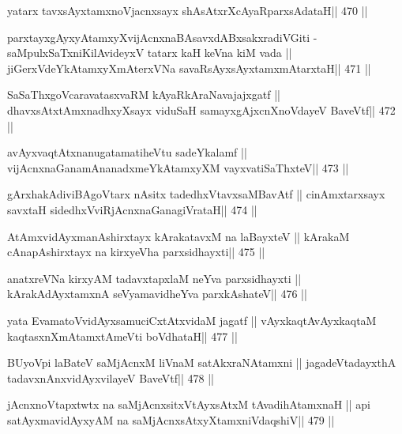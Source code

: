 \begin{shl}
yatarx tavxsAyx\s\s tamxnoV\s jacnxsayx shAsAtxrXcAyaRparxsAdataH\hfill || 470 ||
\end{shl}

\begin{shl}
parxtayxgAyxyAtamxyXvijAcnxnaBAsavxdABxsakxradiVGiti -
saMpulxSaTxniKilAvideyxV tatarx kaH keVna kiM vada ||
jiGerxVdeYkAtamxyXmAterxVNa savaRsAyxsAyx\s\s tamxmAtarxtaH\hfill || 471 ||
\end{shl}

\begin{shl}
SaSaThxgoVcaravatasxvaRM kAyaRkAraNavajajxgatf ||
dhavxsAtxtAmxnadhxyXsayx viduSaH samayxgAjxcnXnoVdayeV BaveVtf\hfill || 472 ||
\end{shl}

\begin{shl}
avAyxvaqtAtxnanugatamatiheVtu sadeYkalamf ||
vijAcnxnaGanamAnanadxmeYkAtamxyXM vayxvatiSaThxteV\hfill || 473 ||
\end{shl}

\begin{shl}
gArxhakAdiviBAgoV\s tarx nAsitx tadedhxVtavxsaMBavAtf ||
cinAmxtarxsayx savxtaH sidedhxVviRjAcnxnaGanagiVrataH\hfill || 474 ||
\end{shl}

\begin{shl}
AtAmxvidAyxmanAshirxtayx kArakatavxM na laBayxteV ||
kArakaM cAnapAshirxtayx na kirxyeVha parxsidhayxti\hfill || 475 ||
\end{shl}

\begin{shl}
anatxreVNa kirxyAM tadavxtapxlaM neYva parxsidhayxti ||
kArakAdAyxtamxnA seVyamavidheYva parxkAshateV\hfill || 476 ||
\end{shl}

\begin{shl}
yata EvamatoV\s vidAyxsamuciCxtAtxvidaM jagatf ||
vAyxkaqtAvAyxkaqtaM kaqtasxnXmAtamxtAmeVti boVdhataH\hfill || 477 ||
\end{shl}

\begin{shl}
BUyoV\s pi laBateV saMjAcnxM liVnaM satAkxraNAtamxni ||
jagadeVtadayxthA tadavxnAnxvidAyxvilayeV BaveVtf\hfill || 478 ||
\end{shl}

\begin{shl}
jAcnxnoVtapxtwtx na saMjAcnx\s sitxVtAyxsAtxM tAvadihA\s\s tamxnaH ||
api satAyxmavidAyxyAM na saMjAcnx\s sAtxyXtamxniVdaqshiV\hfill || 479 ||
\end{shl}

